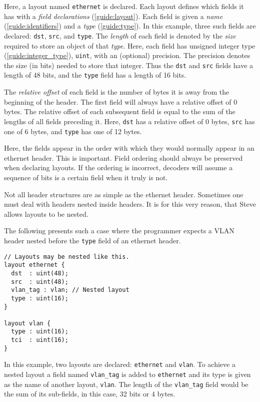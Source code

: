 Here, a layout named \texttt{ethernet} is declared. Each layout defines which
fields it has with a \textit{field declarations} (\ref{guide:layout}). Each
field is given a \textit{name} (\ref{guide:identifiers}) and a \textit{type}
(\ref{guide:type}). In this example, three such fields are declared: \texttt{dst},
\texttt{src}, and \texttt{type}. The \textit{length} of each field is denoted by
the \textit{size} required to store an object of that \textit{type}. Here, each
field has unsigned integer type (\ref{guide:integer_type}), \texttt{uint}, with
an (optional) precision. The precision denotes the size (in bits) needed to
store that integer. Thus the \texttt{dst} and \texttt{src} fields have a length
of 48 bits, and the \texttt{type} field has a length of 16 bits.

The \textit{relative offset} of each field is the number of bytes it is away
from the beginning of the header. The first field will always have a relative
offset of 0 bytes. The relative offset of each subsequent field is equal to the
sum of the lengths of all fields preceding it. Here, \texttt{dst} has a relative
offset of 0 bytes, \texttt{src} has one of 6 bytes, and \texttt{type} has one of
12 bytes.

Here, the fields appear in the order with which they would normally appear
in an ethernet header. This is important. Field ordering should always be
preserved when declaring layouts. If the ordering is incorrect, decoders will
assume a sequence of bits is a certain field when it truly is not.

Not all header structures are as simple as the ethernet header. Sometimes one
must deal with headers nested inside headers. It is for this very reason, that
Steve allows layouts to be nested.

The following presents such a case where the programmer expects a VLAN header
\cite{vlan_std} nested before the \texttt{type} field of an ethernet
header.

\begin{codepage}
\begin{lstlisting}
// Layouts may be nested like this.
layout ethernet {
  dst  : uint(48);
  src  : uint(48);
  vlan_tag : vlan; // Nested layout
  type : uint(16);
}

layout vlan {
  type : uint(16);
  tci  : uint(16);
}
\end{lstlisting}
\end{codepage}

In this example, two layouts are declared: \texttt{ethernet} and \texttt{vlan}. To
achieve a nested layout a field named \texttt{vlan\_tag} is added to
\texttt{ethernet} and its type is given as the name of another layout,
\texttt{vlan}. The length of the \texttt{vlan\_tag} field would be the sum of
its sub-fields, in this case, 32 bits or 4 bytes.

